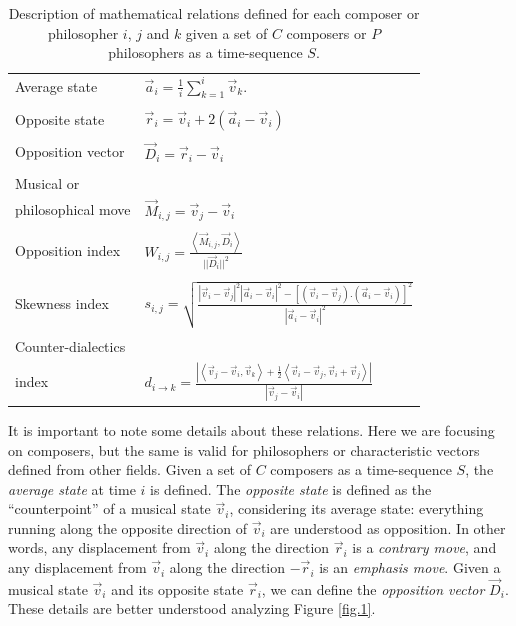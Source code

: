 \documentclass[
 aip,
 jmp,
 amsmath,amssymb,
 reprint,
]{revtex4-1}
\begin{document}
\begin{table}
\caption{\label{tab:tableRelations}Description of mathematical relations defined for each composer or philosopher $i$, $j$ and $k$ given a set of $C$ composers or $P$ philosophers as a time-sequence $S$.}
\begin{ruledtabular}
\begin{tabular}{ll}
\\ Average state & $\vec{a}_i = \frac{1}{i}\sum_{k=1}^i\vec{v}_k.$ \\ \\
Opposite state & $\vec{r}_i = \vec{v}_i + 2(\vec{a}_i - \vec{v}_i)$ \\ \\
Opposition vector & $\vec{D}_i=\vec{r}_i - \vec{v}_i$ \\ \\
Musical or \\ philosophical move & $\vec{M}_{i,j} = \vec{v}_j - \vec{v}_i$ \\ \\
Opposition index & $W_{i,j} = \frac{\left< \vec{M}_{i,j}, \vec{D}_i\right>}{||\vec{D}_i||^2}$ \\ \\
Skewness index & $s_{i,j} = \sqrt{\frac{|\vec{v}_i-\vec{v}_j|^2|\vec{a}_i-\vec{v}_i|^2 - [(\vec{v}_i-\vec{v}_j) . (\vec{a}_i-\vec{v}_i)]^2}{|\vec{a}_i-\vec{v}_i|^2}}$ \\ \\
Counter-dialectics \\ index & $d_{i \rightarrow k} = \frac{|\left< \vec{v}_j-\vec{v}_i,\vec{v}_k \right> + \frac{1}{2}\left<\vec{v}_i-\vec{v}_j, \vec{v}_i+\vec{v}_j\right>|}{|\vec{v}_j-\vec{v}_i|}$
\end{tabular}
\end{ruledtabular}
\end{table}

It is important to note some details about these relations. Here we are focusing on composers, but the same is valid for philosophers or characteristic vectors defined from other fields. Given a set of $C$ composers as a time-sequence $S$, the \emph{average state} at time $i$ is defined. The \emph{opposite state} is defined as the ``counterpoint'' of a musical state $\vec{v}_i$, considering its average state: everything running along the opposite direction of $\vec{v}_i$ are understood as opposition. In other words, any displacement from $\vec{v}_i$ along the direction $\vec{r}_i$ is a \emph{contrary move}, and any displacement from $\vec{v}_i$ along the direction $-\vec{r}_i$ is an \emph{emphasis move}. Given a musical state $\vec{v}_i$ and its opposite state $\vec{r}_i$, we can define the \emph{opposition vector} $\vec{D}_i$. These details are better understood analyzing Figure \ref{fig.1}.
\end{document}
